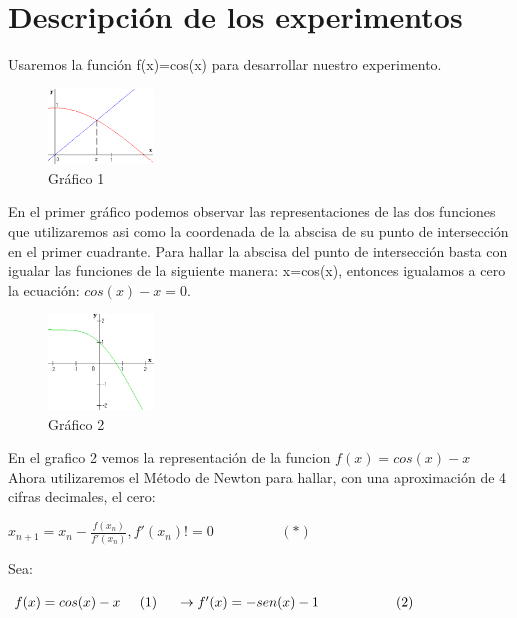 \section{Descripción de los experimentos}
Usaremos la función f(x)=cos(x) para desarrollar nuestro experimento.

\begin{figure}[!th]
\begin{center}
\includegraphics[width=0.25\textwidth]{images/metodo25.eps}
\caption{Gráfico 1}
\end{center}
\end{figure}

En el primer gráfico podemos observar las representaciones de las dos funciones que utilizaremos
asi como la coordenada de la abscisa de su punto de intersección en el primer cuadrante. Para hallar 
la abscisa del punto de intersección basta con igualar las funciones de la siguiente manera:
x=cos(x), entonces igualamos a cero la ecuación: $cos(x)-x = 0.$


\begin{figure}[!th]
\begin{center}
\includegraphics[width=0.25\textwidth]{images/metodo26.eps}
\caption{Gráfico 2}
\end{center}
\end{figure}

En el grafico 2 vemos la representación de la funcion $f(x)=cos(x)-x$
Ahora utilizaremos el Método de Newton para hallar, con una aproximación de 4 cifras decimales, el cero: \\

\centerline{$ x_{n+1} = x_n - \frac{f(x_n)}{f'(x_n)}, f'(x_n)!= 0  \hspace{2cm}(*)$}   
\vspace{0.5cm}

Sea:\\

\centerline{$f(x)=cos(x)-x \hspace{0.5cm}(1) \hspace{0.5cm}\rightarrow f'(x)=-sen(x)-1 \hspace{2cm}(2)$}
\vspace{0.5 cm}

